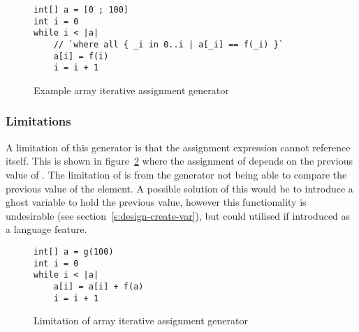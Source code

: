 \begin{figure}
\begin{lstlisting}
int[] a = [0 ; 100]
int i = 0
while i < |a|
	// `where all { _i in 0..i | a[_i] == f(_i) }`
	a[i] = f(i)
	i = i + 1
\end{lstlisting}
\caption{Example array iterative assignment generator}
\label{lst:array-iter-assign}
\end{figure}

\subsubsection{Limitations}

A limitation of this generator is that the assignment expression cannot
reference itself.
This is shown in figure~\ref{lst:limit-array-iter-assign} where the assignment
of  depends on the previous value of .
The limitation of is from the generator not being able to compare the previous
value of the element.
A possible solution of this would be to introduce a ghost variable to hold the
previous value, however this functionality is undesirable (see section~\ref{s:design-create-var}),
but could utilised if introduced as a language feature.


\begin{figure}
\begin{lstlisting}
int[] a = g(100)
int i = 0
while i < |a|
	a[i] = a[i] + f(a)
	i = i + 1
\end{lstlisting}
\caption{Limitation of array iterative assignment generator}
\label{lst:limit-array-iter-assign}
\end{figure}
